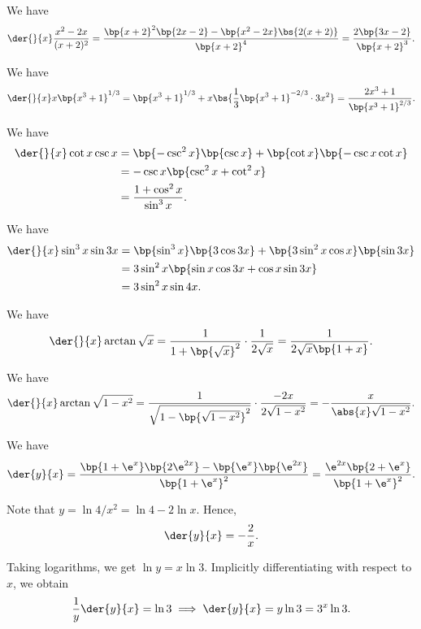 \begin{solution}
    \begin{ppart}
        We have \[\der{}{x} \frac{x^2 - 2x}{(x+2)^2} = \frac{\bp{x+2}^2 \bp{2x-2} - \bp{x^2 - 2x} \bs{2(x+2)}}{\bp{x+2}^4} = \frac{2\bp{3x-2}}{\bp{x+2}^3}.\]
    \end{ppart}
    \begin{ppart}
        We have \[\der{}{x} x\bp{x^3 + 1}^{1/3} = \bp{x^3 + 1}^{1/3} + x\bs{\frac13 \bp{x^3+1}^{-2/3} \cdot 3x^2} = \frac{2x^3 + 1}{\bp{x^3+1}^{2/3}}.\]
    \end{ppart}
    \begin{ppart}
        We have
        \begin{align*}
            \der{}{x} \cot x \csc x &= \bp{-\csc^2 x}\bp{\csc x} + \bp{\cot x}\bp{-\csc x \cot x}\\
            &= -\csc x \bp{\csc^2 x + \cot^2 x}\\
            &= \frac{1 + \cos^2 x}{\sin^3 x}.
        \end{align*}
    \end{ppart}
    \begin{ppart}
        We have
        \begin{align*}
            \der{}{x} \sin^3 x \sin 3x &= \bp{\sin^3 x}\bp{3\cos 3x} + \bp{3\sin^2 x \cos x}\bp{\sin 3x}\\
            &= 3\sin^2 x \bp{\sin x \cos 3x + \cos x \sin 3x}\\
            &= 3\sin^2 x \sin 4x.
        \end{align*}
    \end{ppart}
    \begin{ppart}
        We have \[\der{}{x} \arctan \sqrt{x} = \frac1{1 + \bp{\sqrt x}^2} \cdot \frac1{2 \sqrt x} = \frac1{2 \sqrt{x} \bp{1 + x}}.\]
    \end{ppart}
    \begin{ppart}
        We have \[\der{}{x} \arctan \sqrt{1 - x^2} = \frac1{\sqrt{1 - \bp{\sqrt{1-x^2}}^2}} \cdot \frac{-2x}{2\sqrt{1 - x^2}} = -\frac{x}{\abs{x} \sqrt{1 - x^2}}.\]
    \end{ppart}
    \begin{ppart}
        We have \[\der{y}{x} = \frac{\bp{1 + \e^x}\bp{2\e^{2x}} - \bp{\e^x}\bp{\e^{2x}}}{\bp{1 + \e^x}^2} = \frac{\e^{2x} \bp{2 + \e^x}}{\bp{1 + \e^x}^2}.\]
    \end{ppart}
    \begin{ppart}
        Note that $y = \ln{4/x^2} = \ln 4 - 2\ln x$. Hence, \[\der{y}{x} = -\frac{2}{x}.\]
    \end{ppart}
    \begin{ppart}
        Taking logarithms, we get $\ln y = x \ln 3$. Implicitly differentiating with respect to $x$, we obtain \[\frac1y \der{y}{x} = \ln 3 \implies \der{y}{x} = y \ln 3 = 3^x \ln 3.\]
    \end{ppart}
\end{solution}

